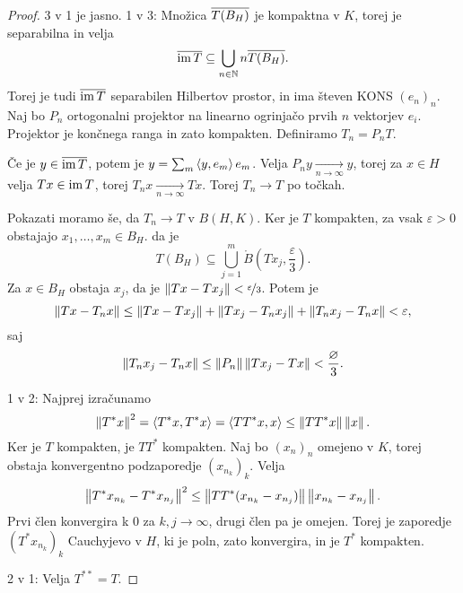 \begin{proof}
  3 v 1 je jasno.
  1 v 3:
  Množica $\overline{T(B_H)}$ je kompaktna v $K$, torej je separabilna in velja
  \[
	\overline{\operatorname{im} T} \subseteq \bigcup_{n \in \mathbb{N}} n \overline{T(B_H)}.
  \]
  Torej je tudi $\overline{\operatorname{im} T}$ separabilen Hilbertov prostor, in ima števen KONS
  $(e_n)_n$.
  Naj bo $P_n$ ortogonalni projektor na linearno ogrinjačo prvih $n$ vektorjev
  $e_i$.
  Projektor je končnega ranga in zato kompakten.
  Definiramo $T_n = P_n T$.

  Če je $y \in \overline{\operatorname{im} T}$, potem je $y = \sum_m \left< y,e_m \right> e_m$.
  Velja $P_n y \xrightarrow[n \to \infty]{} y$, torej za $x \in H$ velja $Tx \in
  \operatorname{im} T$, torej $T_n x \xrightarrow[n \to \infty]{} Tx$.
  Torej $T_n \to T$ po točkah.

  Pokazati moramo še, da $T_n \to T$ v $B(H,K)$.
  Ker je $T$ kompakten, za vsak $\varepsilon > 0$ obstajajo $x_1, \ldots, x_m
  \in B_H$. da je
  \[
	T(B_H) \subseteq \bigcup_{j=1}^m \mathring{B}(T x_j, \frac{\varepsilon}{3}).
  \]
  Za $x \in B_H$ obstaja $x_j$, da je $\left\lVert Tx - Tx_j\right\rVert <
  \nicefrac{\varepsilon}{3}$.
  Potem je
  \[
	\left\lVert Tx - T_n x\right\rVert
	\le \left\lVert Tx - T x_j\right\rVert + \left\lVert T x_j - T_n x_j\right\rVert + \left\lVert T_n x_j - T_n x\right\rVert
	< \varepsilon,
  \]
  saj
  \[
	\left\lVert T_n x_j - T_n x\right\rVert \le \left\lVert P_n\right\rVert \left\lVert T x_j - Tx\right\rVert <
	\frac{\varnothing}{3}.
  \]

  1 v 2:
  Najprej izračunamo
  \[
	\left\lVert T^* x\right\rVert^2
	= \left< T^* x, T^* x \right>
	= \left< T T^* x, x \right>
	\le \left\lVert T T^* x\right\rVert \left\lVert x\right\rVert.
  \]
  Ker je $T$ kompakten, je $T T^*$ kompakten.
  Naj bo $(x_n)_n$ omejeno v $K$, torej obstaja konvergentno podzaporedje
  $(x_{n_k})_k$.
  Velja
  \[
	\left\lVert T^* x_{n_k} - T^* x_{n_j}\right\rVert^2
	\le \left\lVert T T^* (x_{n_k} - x_{n_j})\right\rVert \left\lVert x_{n_k} - x_{n_j}\right\rVert.
  \]
  Prvi člen konvergira k $0$ za $k, j \to \infty$, drugi člen pa je omejen.
  Torej je zaporedje $(T^* x_{n_k})_k$ Cauchyjevo v $H$, ki je poln, zato
  konvergira, in je $T^*$ kompakten.

  2 v 1:
  Velja $T^{**} = T$.
\end{proof}

